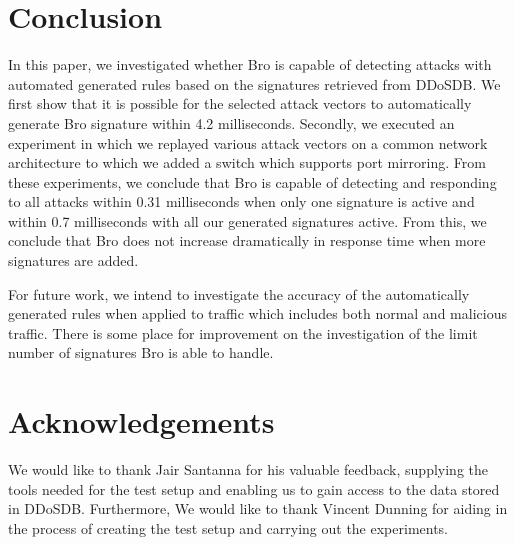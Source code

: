 \section{Conclusion}
\label{section:conclusion}
In this paper, we investigated whether Bro is capable of detecting attacks with automated generated rules based on the signatures retrieved from DDoSDB. We first show that it is possible for the selected attack vectors to automatically generate Bro signature within 4.2 milliseconds. Secondly, we executed an experiment in which we replayed various attack vectors on a common network architecture to which we added a switch which supports port mirroring. From these experiments, we conclude that Bro is capable of detecting and responding to all attacks within 0.31 milliseconds when only one signature is active and within 0.7 milliseconds with all our generated signatures active. From this, we conclude that Bro does not increase dramatically in response time when more signatures are added. 

For future work, we intend to investigate the accuracy of the automatically generated rules when applied to traffic which includes both normal and malicious traffic. There is some place for improvement on the investigation of the limit number of signatures Bro is able to handle. 

\section{Acknowledgements}
We would like to thank Jair Santanna for his valuable feedback, supplying the tools needed for the test setup and enabling us to gain access to the data stored in DDoSDB. Furthermore, We would like to thank Vincent Dunning for aiding in the process of creating the test setup and carrying out the experiments.  